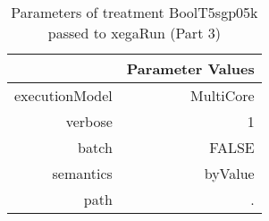 \begin{table}[ht]
\centering
\begin{tabular}{rr}
  \hline
 & Parameter Values \\ 
  \hline
executionModel & MultiCore \\ 
  verbose & 1 \\ 
  batch & FALSE \\ 
  semantics & byValue \\ 
  path & . \\ 
   \hline
\end{tabular}
\caption{ Parameters of treatment BoolT5sgp05k passed to xegaRun
 (Part 3)} 
\end{table}
